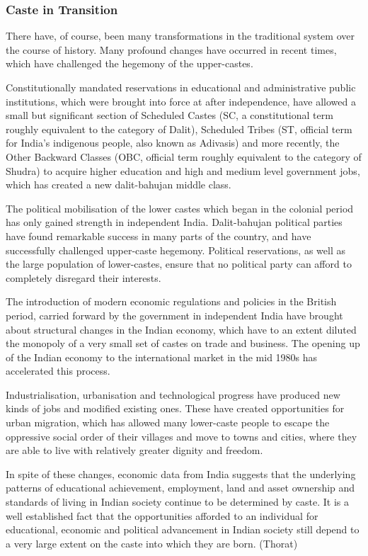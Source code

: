 \documentclass[]{article}
\begin{document}
\subsubsection{Caste in Transition}\label{caste-in-transition}

There have, of course, been many transformations in the traditional
system over the course of history. Many profound changes have occurred
in recent times, which have challenged the hegemony of the upper-castes.

Constitutionally mandated reservations in educational and administrative
public institutions, which were brought into force at after
independence, have allowed a small but significant section of Scheduled
Castes (SC, a constitutional term roughly equivalent to the category of
Dalit), Scheduled Tribes (ST, official term for India's indigenous
people, also known as Adivasis) and more recently, the Other Backward
Classes (OBC, official term roughly equivalent to the category of
Shudra) to acquire higher education and high and medium level government
jobs, which has created a new dalit-bahujan middle class.

The political mobilisation of the lower castes which began in the
colonial period has only gained strength in independent India.
Dalit-bahujan political parties have found remarkable success in many
parts of the country, and have successfully challenged upper-caste
hegemony. Political reservations, as well as the large population of
lower-castes, ensure that no political party can afford to completely
disregard their interests.

The introduction of modern economic regulations and policies in the
British period, carried forward by the government in independent India
have brought about structural changes in the Indian economy, which have
to an extent diluted the monopoly of a very small set of castes on trade
and business. The opening up of the Indian economy to the international
market in the mid 1980s has accelerated this process.

Industrialisation, urbanisation and technological progress have produced
new kinds of jobs and modified existing ones. These have created
opportunities for urban migration, which has allowed many lower-caste
people to escape the oppressive social order of their villages and move
to towns and cities, where they are able to live with relatively greater
dignity and freedom.

In spite of these changes, economic data from India suggests that the
underlying patterns of educational achievement, employment, land and
asset ownership and standards of living in Indian society continue to be
determined by caste. It is a well established fact that the
opportunities afforded to an individual for educational, economic and
political advancement in Indian society still depend to a very large
extent on the caste into which they are born. (Thorat)
\end{document}
